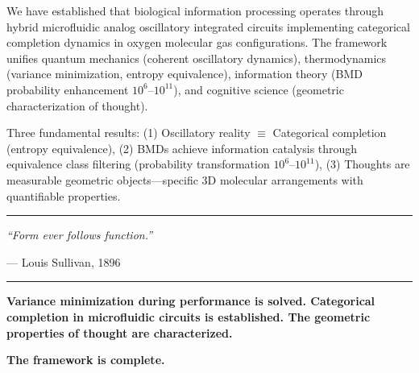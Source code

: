 \documentclass[11pt,a4paper]{article}
\begin{document}
We have established that biological information processing operates through hybrid microfluidic analog oscillatory integrated circuits implementing categorical completion dynamics in oxygen molecular gas configurations. The framework unifies quantum mechanics (coherent oscillatory dynamics), thermodynamics (variance minimization, entropy equivalence), information theory (BMD probability enhancement $10^6$--$10^{11}$), and cognitive science (geometric characterization of thought).

Three fundamental results: (1) Oscillatory reality $\equiv$ Categorical completion (entropy equivalence), (2) BMDs achieve information catalysis through equivalence class filtering (probability transformation $10^6$--$10^{11}$), (3) Thoughts are measurable geometric objects—specific 3D  molecular arrangements with quantifiable properties.


\vspace{1cm}

\begin{center}
\rule{0.5\textwidth}{0.4pt}

\textit{``Form ever follows function.''}

— Louis Sullivan, 1896

\rule{0.5\textwidth}{0.4pt}
\end{center}

\vspace{1cm}

\textbf{Variance minimization during performance is solved. Categorical completion in microfluidic circuits is established. The geometric properties of thought are characterized.}

\textbf{The framework is complete.}




\end{document}
